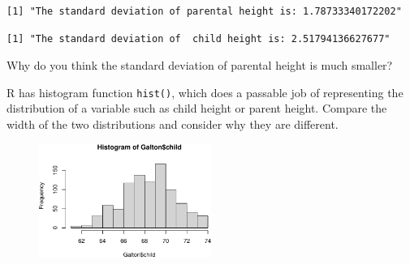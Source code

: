\documentclass[
  letterpaper,
  DIV=11,
  numbers=noendperiod]{scrreprt}
\newenvironment{Shaded}{\begin{snugshade}}{\end{snugshade}}
\newcommand{\FunctionTok}[1]{\textcolor[rgb]{0.28,0.35,0.67}{#1}}
\newcommand{\NormalTok}[1]{\textcolor[rgb]{0.00,0.23,0.31}{#1}}
\newcommand{\SpecialCharTok}[1]{\textcolor[rgb]{0.37,0.37,0.37}{#1}}
\newcommand{\StringTok}[1]{\textcolor[rgb]{0.13,0.47,0.30}{#1}}
\begin{document}
\begin{verbatim}
[1] "The standard deviation of parental height is: 1.78733340172202"
\end{verbatim}

\begin{Shaded}
\end{Shaded}

\begin{verbatim}
[1] "The standard deviation of  child height is: 2.51794136627677"
\end{verbatim}

Why do you think the standard deviation of parental height is much
smaller?

R has histogram function \texttt{hist()}, which does a passable job of
representing the distribution of a variable such as child height or
parent height. Compare the width of the two distributions and consider
why they are different.

\begin{Shaded}
\end{Shaded}

\begin{figure}[H]

{\centering \includegraphics[width=0.5\textwidth,height=\textheight]{./descriptive_files/figure-pdf/unnamed-chunk-4-1.pdf}

}

\end{figure}
\end{document}
